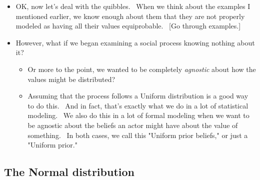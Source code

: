 \documentclass[11pt]{article}
\begin{document}
\begin{itemize}
\item OK, now let's deal with the quibbles. \ When we think about the
examples I mentioned earlier, we know enough about them that they are not
properly modeled as having all their values equiprobable. \ [Go through
examples.]

\item However, what if we began examining a social process knowing nothing
about it?

\begin{itemize}
\item Or more to the point, we wanted to be completely \textit{agnostic }%
about how the values might be distributed? \ 

\item Assuming that the process follows a Uniform distribution is a good way
to do this. \ And in fact, that's exactly what we do in a lot of statistical
modeling. \ We also do this in a lot of formal modeling when we want to be
agnostic about the beliefs an actor might have about the value of something.
\ In both cases, we call this "Uniform prior beliefs," or just a "Uniform
prior."
\end{itemize}
\end{itemize}

\subsection{The Normal distribution}
\end{document}
